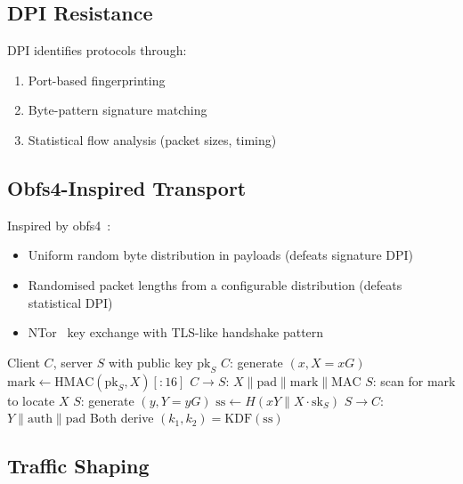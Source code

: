 \documentclass[11pt,a4paper]{article}
\begin{document}
\subsection{DPI Resistance}

DPI identifies protocols through:

\begin{enumerate}
    \item Port-based fingerprinting
    \item Byte-pattern signature matching
    \item Statistical flow analysis (packet sizes, timing)
\end{enumerate}

\subsection{Obfs4-Inspired Transport}

Inspired by obfs4~\cite{angel2014obfs4}:

\begin{itemize}
    \item Uniform random byte distribution in payloads (defeats
    signature DPI)
    \item Randomised packet lengths from a configurable distribution
    (defeats statistical DPI)
    \item NTor~\cite{goldberg2013ntor} key exchange with TLS-like
    handshake pattern
\end{itemize}

\begin{algorithm}[H]
\caption{Obfuscated Handshake}
\label{alg:obfs-handshake}
\begin{algorithmic}[1]
\Require Client $C$, server $S$ with public key $\mathrm{pk}_S$
\State $C$: generate $(x, X = xG)$
\State $\mathrm{mark} \gets \mathrm{HMAC}(\mathrm{pk}_S, X)[:16]$
\State $C \to S$: $X \| \mathrm{pad} \| \mathrm{mark} \| \mathrm{MAC}$
\State $S$: scan for mark to locate $X$
\State $S$: generate $(y, Y = yG)$
\State $\mathrm{ss} \gets H(xY \| X \cdot \mathrm{sk}_S)$
\State $S \to C$: $Y \| \mathrm{auth} \| \mathrm{pad}$
\State Both derive $(k_1, k_2) = \mathrm{KDF}(\mathrm{ss})$
\end{algorithmic}
\end{algorithm}

\subsection{Traffic Shaping}
\end{document}
